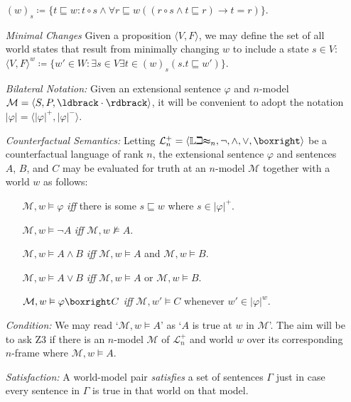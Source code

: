 \documentclass[a4paper, 11pt]{article} %
\newcommand{\tuple}[1]{\langle#1\rangle} %
\newcommand{\set}[1]{\lbrace#1\rbrace} %
\newcommand{\Lit}[0]{\mathbb{Lit}}
\newcommand{\M}[0]{\mathcal{M}}
\renewcommand{\L}[0]{\mathcal{L}}
\renewcommand{\Vert}[1]{\ldbrack#1\rdbrack}
\renewcommand{\vert}[1]{\lvert#1\rvert}
\begin{document}
\begin{enumerate}
    $(w)_s\coloneq \set{t\sqsubseteq w:t\circ s \wedge \forall r\sqsubseteq w((r\circ s \wedge t \sqsubseteq r) \rightarrow t = r)}$.
  \item[\it Minimal Changes] Given a proposition $\tuple{V,F}$, we may define the set of all world states that result from minimally changing $w$ to include a state $s\in V$:\\ 
      $\tuple{V,F}^w\coloneq \set{w'\in W:\exists s\in V\exists t\in(w)_s(s.t\sqsubseteq w')}$.
  \item[\it Bilateral Notation:] Given an extensional sentence $\varphi$ and $n$-model $\M=\tuple{S,P,\Vert{\cdot}}$, it will be convenient to adopt the notation $\vert{\varphi}=\tuple{\vert{\varphi}^+,\vert{\varphi}^-}$.
  \item[\it Counterfactual Semantics:] Letting $\L_n^+=\tuple{\Lit_n,\neg,\wedge,\vee,\boxright}$ be a counterfactual language of rank $n$, the extensional sentence $\varphi$ and sentences $A$, $B$, and $C$ may be evaluated for truth at an $n$-model $\M$ together with a world $w$ as follows:
    \begin{itemize}
      \item[] $\M, w \vDash \varphi$ \textit{iff} there is some $s \sqsubseteq w$ where $s \in \vert{\varphi}^+$.
      \item[] $\M, w \vDash \neg A$ \textit{iff} $\M, w \nvDash A$.
      \item[] $\M, w \vDash A \wedge B$ \textit{iff} $\M, w \vDash A$ and $\M, w \vDash B$.
      \item[] $\M, w \vDash A \vee B$ \textit{iff} $\M, w \vDash A$ or $\M, w \vDash B$.
      \item[] $\M, w \vDash \varphi\boxright C$ \textit{iff} $\M, w' \vDash C$ whenever $w'\in\vert{\varphi}^w$.
    \end{itemize}
  \item[\it Condition:] We may read `$\M, w \vDash A$' as `$A$ is true at $w$ in $\M$'. 
    The aim will be to ask Z3 if there is an $n$-model $\M$ of $\L_n^+$ and world $w$ over its corresponding $n$-frame where $\M, w \vDash A$.
  \item[\it Satisfaction:] A world-model pair \textit{satisfies} a set of sentences $\Gamma$ just in case every sentence in $\Gamma$ is true in that world on that model.

\end{enumerate}
\end{document}
